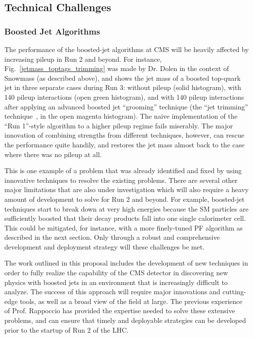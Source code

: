 \documentclass[12pt]{proposalnsf}
\begin{document}
\subsection{Technical Challenges}
\label{sec:technicalchallenges}

\subsubsection{Boosted Jet Algorithms}
\label{sec:boostedjets}

The performance of the boosted-jet algorithms at CMS will be heavily
affected by increasing pileup in Run 2 and beyond. For instance,
Fig.~\ref{jetmass_toptags_trimming} was made by Dr. Dolen in
the context of Snowmass (as described above), and shows the jet
mass of a boosted top-quark jet in three separate cases during Run 3: 
without pileup (solid histogram), with 140 pileup
interactions (open green histogram), and with 140 pileup
interactions after applying an advanced boosted jet ``grooming''
technique (the ``jet trimming'' technique~\cite{trimming}, in the open
magenta
histogram). The naive implementation of the
``Run 1''-style
algorithm to a higher pileup regime fails miserably. The major
innovation of combining strengths from different techniques, however,
can rescue the performance quite handily, and restores the jet mass
almost back to the case where there was no pileup at all. 

This is one example of a problem that was already identified and fixed
by using innovative techniques to resolve the existing problems. There
are several other major limitations that are also under investigation
which will also require a heavy amount of development to solve for Run
2 and beyond. For example, boosted-jet techniques start to break down
at very high energies because the SM particles are sufficiently
boosted that their decay products fall into one single calorimeter
cell. This could be mitigated, for instance, with a more finely-tuned
PF algorithm as described in the next section. Only through a robust
and comprehensive development and deployment strategy will these
challenges be met. 

The work outlined in this proposal includes the development of new
techniques in order to fully realize the
capability of the CMS detector in discovering new physics with boosted
jets in an environment that is increasingly difficult to analyze. The
success of this approach
will require major innovations and cutting-edge tools, as
well as a broad view of the field at large. The
previous experience of Prof. Rappoccio has provided the expertise
needed to solve these extensive problems, and can ensure that timely
and deployable strategies can be developed prior to the startup of Run
2 of the LHC. 
\end{document}
